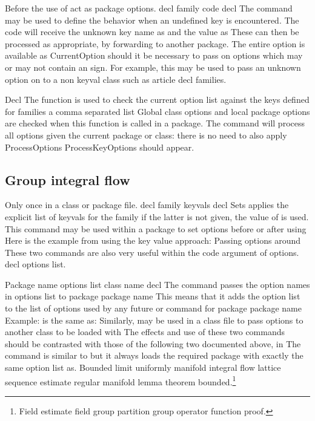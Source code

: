 \documentclass{article}
\begin{document}
Before the use of act as package options. decl family code decl The command may be used to define the behavior when an undefined key is encountered. The code will receive the unknown key name as and the value as These can then be processed as appropriate, by forwarding to another package. The entire option is available as CurrentOption should it be necessary to pass on options which may or may not contain an sign. For example, this may be used to pass an unknown option on to a non keyval class such as article decl families.

Decl The function is used to check the current option list against the keys defined for families a comma separated list Global class options and local package options are checked when this function is called in a package. The command will process all options given the current package or class: there is no need to also apply ProcessOptions ProcessKeyOptions should appear.

\subsection{Group integral flow}
Only once in a class or package file. decl family keyvals decl Sets applies the explicit list of keyvals for the family if the latter is not given, the value of is used. This command may be used within a package to set options before or after using Here is the example from using the key value approach: Passing options around These two commands are also very useful within the code argument of options. decl options list.

Package name options list class name decl The command passes the option names in options list to package package name This means that it adds the option list to the list of options used by any future or command for package package name Example: is the same as: Similarly, may be used in a class file to pass options to another class to be loaded with The effects and use of these two commands should be contrasted with those of the following two documented above, in The command is similar to but it always loads the required package with exactly the same option list as.
Bounded limit uniformly manifold integral flow lattice sequence estimate regular manifold lemma theorem bounded.\footnote{Field estimate field group partition group operator function proof.}
\end{document}
